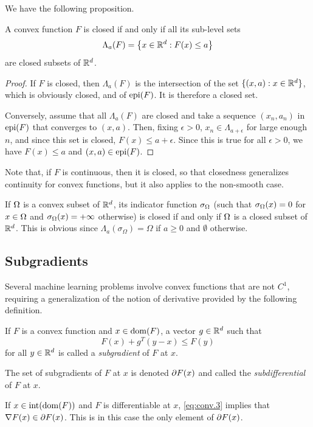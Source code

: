 We have the following proposition. 
\begin{proposition}
\label{prop:closed}
A convex function $F$ is closed if and only if all its sub-level sets 
\[
\Lambda_a(F) = \left\{ x\in {\mathbb{R}}^d: F(x) \leq a \right\}
\]
are closed subsets of ${\mathbb{R}}^d$. 
\end{proposition}
\begin{proof}
If $F$ is closed, then $\Lambda_a(F)$ is the intersection of the set $\{(x,a): x\in {\mathbb{R}}^d\}$, which is obviously closed, and of $\mathrm{epi}(F)$. It is therefore a closed set. 

Conversely, assume that all $\Lambda_a(F)$ are closed and  take a sequence $(x_n, a_n)$ in $\mathrm{epi}(F)$ that converges to $(x,a)$. Then, fixing $\epsilon>0$, $x_n \in \Lambda_{a+\epsilon}$ for large enough $n$, and since this set is closed, $F(x) \leq a+\epsilon$. Since this is true for all $\epsilon>0$, we have $F(x)\leq a$ and $(x,a)\in \mathrm{epi}(F)$.
\end{proof}

Note that, if $F$ is continuous, then it is closed, so that closedness generalizes continuity for convex functions, but it also applies to the non-smooth case.

If $\Omega$ is a convex subset of ${\mathbb{R}}^d$, its indicator function $\sigma_\Omega$ (such that $\sigma_\Omega(x)= 0$ for $x\in \Omega$ and $\sigma_\Omega(x) = +\infty$ otherwise)  is closed if and only if $\Omega$ is a closed subset of ${\mathbb{R}}^d$. This is obvious since $\Lambda_a(\sigma_\Omega) = \Omega$ if $a\geq 0$ and $\emptyset$ otherwise. 


\subsection{Subgradients}
Several machine learning problems involve convex functions that are not $C^1$, requiring a generalization of the notion of derivative provided by the following definition.
\begin{definition}
\label{def:subgradient}
If $F$ is a convex function and $x\in \mathrm{dom}(F)$, a vector $g\in {\mathbb{R}}^d$ such that 
\begin{equation}
\label{eq:subg}
F(x) + g^T(y-x) \leq F(y) 
\end{equation}
for all $y\in {\mathbb{R}}^d$ is called a {\em subgradient} of $F$ at $x$. 

The set of subgradients of $F$ at $x$ is denoted $\partial F(x)$ and called the {\em subdifferential} of $F$ at $x$. 
\end{definition}

If $x\in \mathrm{int}({\mathrm{dom}}(F))$ and $F$ is differentiable at $x$, \cref{eq:conv.3} implies that $\nabla F(x) \in \partial F(x)$.  This is in this case the only element of $\partial F(x)$.

